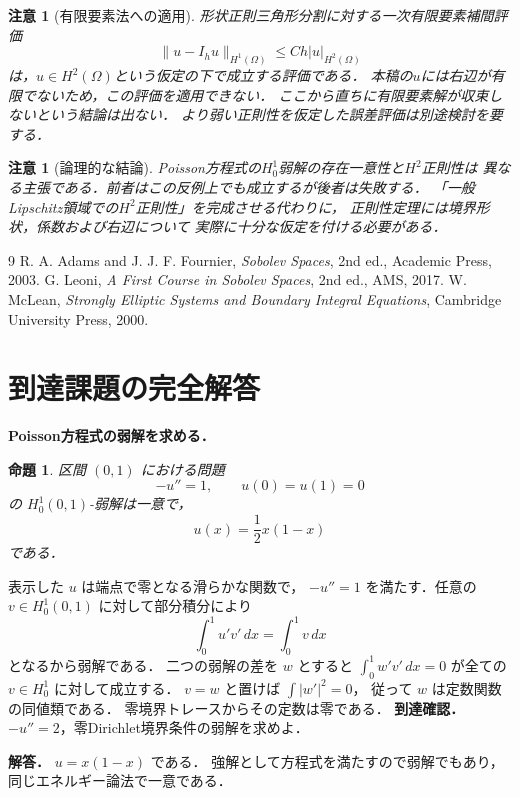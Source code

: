 \documentclass[a5paper,10pt,onecolumn]{jsarticle}
\makeatletter
\theoremstyle{mathnotetheorem}
\newtheorem{proposition}[theorem]{命題}
\newtheorem{remark}[theorem]{注意}
\renewcommand{\proofname}{証明}
\renewenvironment{proof}[1][\proofname]{%
  \par\pushQED{\qed}\normalfont\topsep4\p@\@plus2\p@\relax
  \trivlist\item[\hskip\labelsep\bfseries #1]\ignorespaces
}{\popQED\endtrivlist\@endpefalse}
\makeatother
\begin{document}
\begin{remark}[有限要素法への適用]
形状正則三角形分割に対する一次有限要素補間評価
\[
 \|u-I_hu\|_{H^1(\Omega)}\le Ch|u|_{H^2(\Omega)}
\]
は，$u\in H^2(\Omega)$という仮定の下で成立する評価である．
本稿の$u$には右辺が有限でないため，この評価を適用できない．
ここから直ちに有限要素解が収束しないという結論は出ない．
より弱い正則性を仮定した誤差評価は別途検討を要する．
\end{remark}

\begin{remark}[論理的な結論]
Poisson方程式の$H_0^1$弱解の存在一意性と$H^2$正則性は
異なる主張である．前者はこの反例上でも成立するが後者は失敗する．
「一般Lipschitz領域での$H^2$正則性」を完成させる代わりに，
正則性定理には境界形状，係数および右辺について
実際に十分な仮定を付ける必要がある．
\end{remark}



\begin{thebibliography}{9}
 R. A. Adams and J. J. F. Fournier,
 \emph{Sobolev Spaces}, 2nd ed., Academic Press, 2003.
 G. Leoni, \emph{A First Course in Sobolev Spaces},
 2nd ed., AMS, 2017.
 W. McLean,
 \emph{Strongly Elliptic Systems and Boundary Integral Equations},
 Cambridge University Press, 2000.
\end{thebibliography}

\section{到達課題の完全解答}
\noindent\textbf{Poisson方程式の弱解を求める．}
\begin{proposition}
区間 $(0,1)$ における問題
\[
-u''=1,\qquad u(0)=u(1)=0
\]
の $H_0^1(0,1)$-弱解は一意で，
\[
u(x)=\frac12x(1-x)
\]
である．
\end{proposition}
\begin{proof}
表示した $u$ は端点で零となる滑らかな関数で，
$-u''=1$ を満たす．任意の
$v\in H_0^1(0,1)$ に対して部分積分により
\[
\int_0^1u'v'\,dx=\int_0^1v\,dx
\]
となるから弱解である．
二つの弱解の差を $w$ とすると
$\int_0^1w'v'\,dx=0$ が全ての
$v\in H_0^1$ に対して成立する．
$v=w$ と置けば $\int|w'|^2=0$，
従って $w$ は定数関数の同値類である．
零境界トレースからその定数は零である．
\end{proof}
\noindent\textbf{到達確認．}
$-u''=2$，零Dirichlet境界条件の弱解を求めよ．
\par\noindent\textbf{解答．}
$u=x(1-x)$ である．
強解として方程式を満たすので弱解でもあり，
同じエネルギー論法で一意である．
\end{document}
